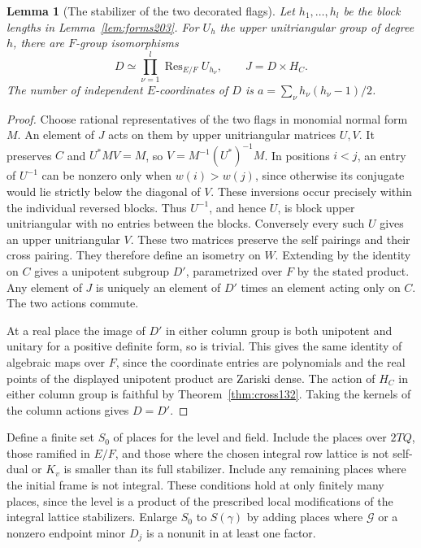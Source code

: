 \documentclass[a4paper,11pt]{article}
\newtheorem{lemma}[proposition]{Lemma}
\theoremstyle{definition}
\theoremstyle{remark}
\numberwithin{equation}{section}
\begin{document}
\begin{lemma}[The stabilizer of the two decorated flags]
\label{lem:stab205}
Let \(h_1,\ldots,h_l\) be the block lengths in
Lemma~\ref{lem:forms203}. For \(U_h\) the upper unitriangular group
of degree \(h\), there are \(F\)-group isomorphisms
\[
 D\simeq \prod_{\nu=1}^l\operatorname{Res}_{E/F}U_{h_\nu},
 \qquad J=D\times H_C .
\]
The number of independent \(E\)-coordinates of \(D\) is
\(a=\sum_\nu h_\nu(h_\nu-1)/2\).
\end{lemma}
\begin{proof}
Choose rational representatives of the two flags in monomial normal
form \(M\). An element of \(J\) acts on them by upper unitriangular
matrices \(U,V\). It preserves \(C\) and \(U^* M V=M\), so
\(V=M^{-1}(U^*)^{-1}M\). In positions \(i<j\), an entry of
\(U^{-1}\) can be nonzero only when \(w(i)>w(j)\), since otherwise
its conjugate would lie strictly below the diagonal of \(V\).
These inversions occur precisely within the individual reversed
blocks. Thus \(U^{-1}\), and hence \(U\), is block upper unitriangular
with no entries between the blocks. Conversely every such \(U\)
gives an upper unitriangular \(V\). These two matrices preserve the
self pairings and their cross pairing. They therefore define an
isometry on \(W\). Extending by the identity on \(C\) gives a
unipotent subgroup \(D'\), parametrized over \(F\) by the stated
product. Any element of \(J\) is uniquely an element of \(D'\)
times an element acting only on \(C\). The two actions commute.

At a real place the image of \(D'\) in either column group is both
unipotent and unitary for a positive definite form, so is trivial.
This gives the same identity of algebraic maps over \(F\), since
the coordinate entries are polynomials and the real points of the
displayed unipotent product are Zariski dense. The action of \(H_C\)
in either column group is faithful by Theorem~\ref{thm:cross132}.
Taking the kernels of the column actions gives \(D=D'\).
\end{proof}

Define a finite set \(S_0\) of places for the level and field. Include
the places over \(2TQ\), those ramified in \(E/F\), and those where the
chosen integral row lattice is not self-dual or \(K_v\) is smaller
than its full stabilizer. Include any remaining places where the
initial frame is not integral. These conditions hold at only finitely
many places, since the level is a product of the prescribed local
modifications of the integral lattice stabilizers. Enlarge \(S_0\)
to \(S(\gamma)\) by adding places where \(\mathcal G\) or a nonzero
endpoint minor \(D_j\) is a nonunit in at least one factor.
\end{document}
